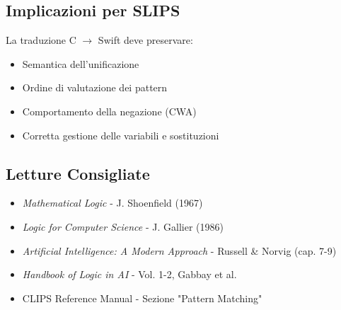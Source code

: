 \subsection{Implicazioni per SLIPS}

La traduzione C $\rightarrow$ Swift deve preservare:
\begin{itemize}
\item Semantica dell'unificazione
\item Ordine di valutazione dei pattern
\item Comportamento della negazione (CWA)
\item Corretta gestione delle variabili e sostituzioni
\end{itemize}

\subsection{Letture Consigliate}

\begin{itemize}
\item \textit{Mathematical Logic} - J. Shoenfield (1967)
\item \textit{Logic for Computer Science} - J. Gallier (1986)
\item \textit{Artificial Intelligence: A Modern Approach} - Russell \& Norvig (cap. 7-9)
\item \textit{Handbook of Logic in AI} - Vol. 1-2, Gabbay et al.
\item CLIPS Reference Manual - Sezione "Pattern Matching"
\end{itemize}

